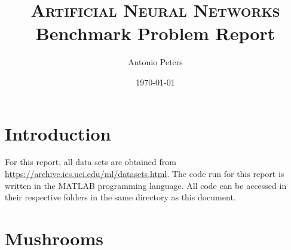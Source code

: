 \documentclass{article}%
\title{
\textsc{Artificial Neural Networks} \\ [25pt]
\huge Benchmark Problem Report \\ %
}
\author{Antonio Peters} %
\date{\today} %
\begin{document}
\maketitle %
\section{Introduction}
For this report, all data sets are obtained from \url{https://archive.ics.uci.edu/ml/datasets.html}. The code run for this report is written in the MATLAB programming language. All code can be accessed in their respective folders in the same directory as this document.
\section{Mushrooms}

\end{document}
